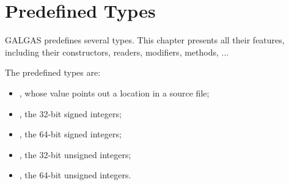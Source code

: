 \chapter{Predefined Types} \label{predefinedTypes}

GALGAS predefines several types. This chapter presents all their features, including their constructors, readers, modifiers, methods, ...


\begin{description}
\item The predefined types are:
\begin{itemize}
\item {}, whose value points out a location in a source file;
\item {}, the 32-bit signed integers;
\item {}, the 64-bit signed integers;
\item {}, the 32-bit unsigned integers;
\item {}, the 64-bit unsigned integers.
\end{itemize}
\end{description}







